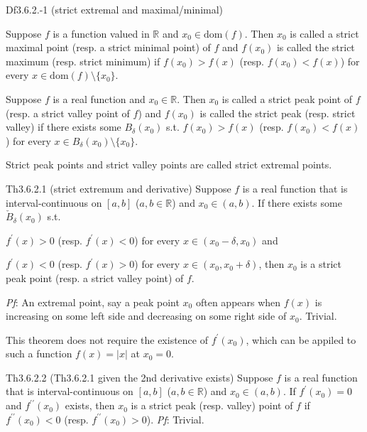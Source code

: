 \documentclass{article}
\begin{document}
\begin{Df}{Df3.6.2.-1 (strict extremal and maximal/minimal)}
    \begin{compactenum}
        \item Suppose $f$ is a function valued in $\mathbb{R}$ and $x_0\in\text{dom}(f)$. Then $x_0$ is called a strict maximal point (resp. a strict minimal point) of $f$ and $f(x_0)$ is called the strict maximum (resp. strict minimum) if $f(x_0) > f(x)$ (resp. $f(x_0) < f(x)$) for every $x\in\text{dom}(f)\setminus\{x_0\}$.
        \item Suppose $f$ is a real function and $x_0\in\mathbb{R}$. Then $x_0$ is called a strict peak point of $f$ (resp. a strict valley point of $f$) and $f(x_0)$ is called the strict peak (resp. strict valley) if there exists some $B_\delta(x_0)$ s.t. $f(x_0) > f(x)$ (resp. $f(x_0) < f(x)$) for every $x\in B_\delta(x_0)\setminus\{x_0\}$.
        \item Strict peak points and strict valley points are called strict extremal points.
    \end{compactenum}
\end{Df}

\begin{Th}{Th3.6.2.1 (strict extremum and derivative)}
    Suppose $f$ is a real function that is interval-continuous on $[a,b]$ ($a,b\in\mathbb{R}$) and $x_0\in (a,b)$. If there exists some $\check{B}_\delta(x_0)$ s.t. 
    \begin{compactenum}
        \item $f^\prime(x) > 0$ (resp. $f^\prime(x) < 0$) for every $x\in (x_0-\delta, x_0)$ and 
        \item $f^\prime(x) < 0$ (resp. $f^\prime(x) > 0$) for every $x\in (x_0, x_0+\delta)$, then $x_0$ is a strict peak point (resp. a strict valley point) of $f$.
    \end{compactenum}
    \tcblower
    \textit{Pf}: An extremal point, say a peak point $x_0$ often appears when $f(x)$ is increasing on some left side and decreasing on some right side of $x_0$. Trivial.
\end{Th}

\begin{Rmk}{}
    This theorem does not require the existence of $f^\prime(x_0)$, which can be appiled to such a function $f(x) = |x|$ at $x_0 = 0$.
\end{Rmk}

\begin{Th}{Th3.6.2.2 (Th3.6.2.1 given the 2nd derivative exists)}
    Suppose $f$ is a real function that is interval-continuous on $[a,b]$ ($a,b\in\mathbb{R}$) and $x_0\in (a,b)$. If $f^\prime (x_0) = 0$ and $f^{\prime\prime}(x_0)$ exists, then $x_0$ is a strict peak (resp. valley) point of $f$ if $f^{\prime\prime}(x_0) < 0$ (resp. $f^{\prime\prime}(x_0) > 0$).
    \tcblower
    \textit{Pf}: Trivial.
\end{Th}
\end{document}
